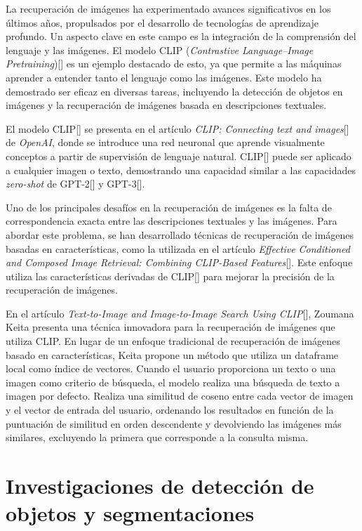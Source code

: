 La recuperación de imágenes ha experimentado avances significativos en los últimos años, propulsados por el desarrollo de tecnologías de aprendizaje profundo. Un aspecto clave en este campo es la integración de la comprensión del lenguaje y las imágenes. El modelo CLIP (\textit{Contrastive Language–Image Pretraining})[\cite{clip-paper}] es un ejemplo destacado de esto, ya que permite a las máquinas aprender a entender tanto el lenguaje como las imágenes. Este modelo ha demostrado ser eficaz en diversas tareas, incluyendo la detección de objetos en imágenes y la recuperación de imágenes basada en descripciones textuales.

El modelo CLIP[\cite{clip}] se presenta en el artículo  \textit{CLIP: Connecting text and images}[\cite{clip}] de \textit{OpenAI}, donde se introduce una red neuronal que aprende visualmente conceptos a partir de supervisión de lenguaje natural. CLIP[\cite{clip}] puede ser aplicado a cualquier imagen o texto, demostrando una capacidad similar a las capacidades \textit{zero-shot} de GPT-2[\cite{gpt2}] y GPT-3[\cite{gpt3}].

Uno de los principales desafíos en la recuperación de imágenes es la falta de correspondencia exacta entre las descripciones textuales y las imágenes. Para abordar este problema, se han desarrollado técnicas de recuperación de imágenes basadas en características, como la utilizada en el artículo \textit{Effective Conditioned and Composed Image Retrieval: Combining CLIP-Based Features}[\cite{Baldrati2022}]. Este enfoque utiliza las características derivadas de CLIP[\cite{clip}] para mejorar la precisión de la recuperación de imágenes.

En el artículo \textit{Text-to-Image and Image-to-Image Search Using CLIP}[\cite{keita2023clip}], Zoumana Keita presenta una técnica innovadora para la recuperación de imágenes que utiliza CLIP. En lugar de un enfoque tradicional de recuperación de imágenes basado en características, Keita propone un método que utiliza un dataframe local como índice de vectores. Cuando el usuario proporciona un texto o una imagen como criterio de búsqueda, el modelo realiza una búsqueda de texto a imagen por defecto. Realiza una similitud de coseno entre cada vector de imagen y el vector de entrada del usuario, ordenando los resultados en función de la puntuación de similitud en orden descendente y devolviendo las imágenes más similares, excluyendo la primera que corresponde a la consulta misma.

\section{Investigaciones de detección de objetos y segmentaciones}


